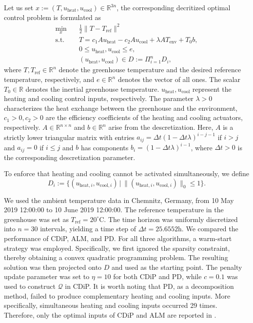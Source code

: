 \documentclass[11pt,a4paper,reqno]{amsart}
\begin{document}
{Let us set $x:=(T, u_{\text{heat}}, u_{\text{cool}})\in \mathbb R^{3n}$, the corresponding decritized optimal control problem is formulated as 
\begin{equation}\label{Eq:discrGreenhous}
\begin{aligned}
    \min_{x}
\quad & \frac{1}{2}\|T-T_{\text{ref}}\|^2
\\
\text{s.t.}\quad
& T=c_1Au_{\text{heat}}-c_2 A u_{\text{cool}}+\lambda A T_{\text{env}}+ T_0b, \\
& 0\leq u_{\text{heat}}, u_{\text{cool}} \leq e, \\
& (u_{\text{heat}}, u_{\text{cool}})\in D:=\Pi_{i=1}^n D_i ,
\end{aligned}
\end{equation}
where $T, T_{\text{ref}} \in \mathbb R^n$ denote the greenhouse temperature and the desired reference temperature, respectively, and $e\in \mathbb R^n$ denotes the vector of all ones. The scalar $T_0\in \mathbb R$ denotes the inertial greenhouse temperature. $u_{\text{heat}}, u_{\text{cool}}$ represent the heating and cooling control inputs, respectively. The parameter $\lambda>0$ characterizes the heat exchange between the greenhouse and the environment, $c_1>0, c_2>0$ are the efficiency coefficients of the heating and cooling actuators, respectively. $A\in \mathbb R^{n \times n}$ and $b\in \mathbb R^n$ arise from the descretization. Here, $A$ is a strictly lower triangular matrix with entries $a_{ij}=\Delta t(1-\Delta t\lambda)^{i-j-1}$ if $i>j$ and $a_{ij}=0$ if $i \leq j$ and $b$ has components $b_i=(1-\Delta t \lambda)^{i-1}$, where $\Delta t>0$ is the corresponding descretization parameter.

To enforce that heating and cooling cannot be activated simultaneously, we define
\begin{equation*}
    D_i:=\{ ({u_{\text{heat},i}}, {u_{\text{cool},i}}) \,|\, \|({u_{\text{heat},i}}, {u_{\text{cool},i}}) \|_0 \leq 1\}.
\end{equation*}

We used the ambient temperature data in Chemnitz, Germany, from 10 May 2019 12:00:00 to 10 June 2019 12:00:00. The reference temperature in the greenhouse was set as $T_{\text{ref}}=20^\circ\mathrm{C}$. The time horizon was uniformly discretized into $n=30$ intervals, yielding a time step of $\Delta t=25.6552$h. We compared the performance of CDiP, ALM, and PD. For all three algorithms, a warm-start strategy was employed. Specifically, we first ignored the sparsity constraint, thereby obtaining a convex quadratic programming problem. The resulting solution was then projected onto $D$ and used as the starting point. The penalty update parameter was set to $\eta =10$ for both CDiP and PD, while $c=0.1$ was used to construct $\mathcal Q$ in CDiP. It is worth noting that PD, as a decomposition method, failed to produce complementary heating and cooling inputs. More specifically, simultaneous heating and cooling inputs occurred 29 times. Therefore, only the optimal inputs of CDiP and ALM are reported in
.

}
\end{document}
